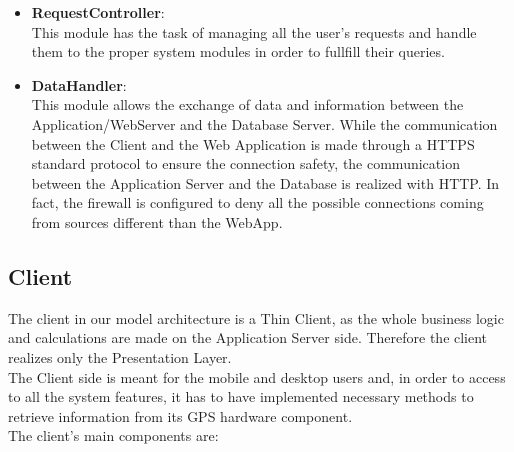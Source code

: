 \documentclass[numbers=noenddot, 12pt, a4paper, oneside]{scrbook}
\begin{document}
\begin{itemize}
	\item \textbf{RequestController}:\\\newline
	This module has the task of managing all the user's requests and handle them to the proper system modules in order to fullfill their queries.\\

	\item \textbf{DataHandler}:\\\newline
	This module allows the exchange of data and information between the Application/WebServer and the Database Server. While the communication between the Client and the Web Application is made through a HTTPS standard protocol to ensure the connection safety, the communication between the Application Server and the Database is realized with HTTP. In fact, the firewall is configured to deny all the possible connections coming from sources different than the WebApp.\\

\end{itemize}

\subsection*{Client}

The client in our model architecture is a Thin Client, as the whole business logic and calculations are made on the Application Server side. Therefore the client realizes only the Presentation Layer.\\

The Client side is meant for the mobile and desktop users and, in order to access to all the system features, it has to have implemented necessary methods to retrieve information from its GPS hardware component.\\

The client's main components are:
\end{document}
